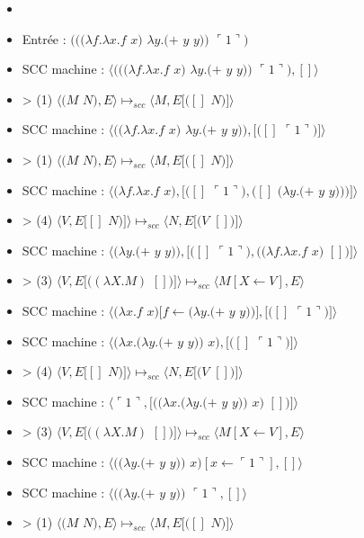 \documentclass[10pt,a4paper]{article}
\begin{document}
				\begin{itemize}
					\item[]
					\item[] Entrée : $(((\lambda f.\lambda x.f$ $x)$ $\lambda y.(+$ $y$ $y))$ $\ulcorner 1\urcorner)$ 
					\smallbreak
					\item[] SCC machine : $\langle(((\lambda f.\lambda x.f$ $x)$ $\lambda y.(+$ $y$ $y))$ $\ulcorner 1\urcorner),[]\rangle$
					\item[] > (1) $\langle(M$ $N),E\rangle \longmapsto_{scc} \langle M,E[([]$ $N)]\rangle$
					\item[] SCC machine : $\langle((\lambda f.\lambda x.f$ $x)$ $\lambda y.(+$ $y$ $y)),[([]$ $\ulcorner 1\urcorner)]\rangle$
					\item[] > (1) $\langle(M$ $N),E\rangle \longmapsto_{scc} \langle M,E[([]$ $N)]\rangle$
					\item[] SCC machine : $\langle(\lambda f.\lambda x.f$ $x),[([]$ $\ulcorner 1\urcorner),([]$ $(\lambda y.(+$ $y$ $y)))]\rangle$
					\item[] > (4) $\langle V,E[[]$ $N)]\rangle \longmapsto_{scc} \langle N,E[(V$ $[])]\rangle$
					\item[] SCC machine : $\langle(\lambda y.(+$ $y$ $y)),[([]$ $\ulcorner 1\urcorner),((\lambda f.\lambda x.f$ $x)$ $[])]\rangle$
					\item[] > (3) $\langle V,E[((\lambda X.M)$ $[])]\rangle \longmapsto_{scc} \langle M[X\leftarrow V],E\rangle$
					\item[] SCC machine : $\langle(\lambda x.f$ $x)[f\leftarrow(\lambda y.(+$ $y$ $y))],[([]$ $\ulcorner 1\urcorner)]\rangle$
					\item[] SCC machine : $\langle(\lambda x.(\lambda y.(+$ $y$ $y))$ $x),[([]$ $\ulcorner 1\urcorner)]\rangle$
					\item[] > (4) $\langle V,E[[]$ $N)]\rangle \longmapsto_{scc} \langle N,E[(V$ $[])]\rangle$
					\item[] SCC machine : $\langle\ulcorner 1\urcorner,[((\lambda x.(\lambda y.(+$ $y$ $y))$ $x)$ $[])]\rangle$
					\item[] > (3) $\langle V,E[((\lambda X.M)$ $[])]\rangle \longmapsto_{scc} \langle M[X\leftarrow V],E\rangle$
					\item[] SCC machine : $\langle((\lambda y.(+$ $y$ $y))$ $x)[x \leftarrow\ulcorner 1\urcorner],[]\rangle$
					\item[] SCC machine : $\langle((\lambda y.(+$ $y$ $y))$ $\ulcorner 1\urcorner,[]\rangle$
					\item[] > (1) $\langle(M$ $N),E\rangle \longmapsto_{scc} \langle M,E[([]$ $N)]\rangle$

\end{itemize}
\end{document}
